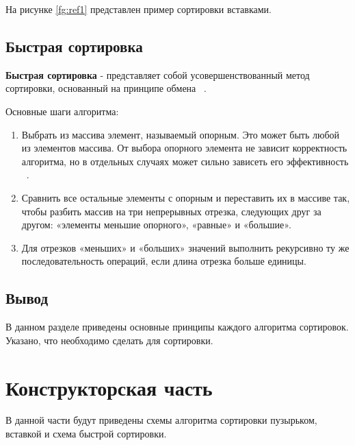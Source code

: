 \documentclass[12pt]{report}
\begin{document}
 На рисунке \ref{fg:ref1} представлен пример сортировки вставками.
\begin{figure}[ht!]
\end{figure}
\newpage
 \section{Быстрая сортировка}
 \textbf{Быстрая сортировка} - представляет собой усовершенствованный метод сортировки, основанный на принципе обмена  ~\cite{four}.

Основные шаги алгоритма:
\begin{enumerate}
\item Выбрать из массива элемент, называемый опорным. Это может быть любой из элементов массива. От выбора опорного элемента не зависит корректность алгоритма, но в отдельных случаях может сильно зависеть его эффективность ~\cite{five}.  
\item Сравнить все остальные элементы с опорным и переставить их в массиве так, чтобы разбить массив на три непрерывных отрезка, следующих друг за другом: «элементы меньшие опорного», «равные» и «большие».
\item Для отрезков «меньших» и «больших» значений выполнить рекурсивно ту же последовательность операций, если длина отрезка больше единицы.
\end{enumerate}

\section{Вывод}
В данном разделе приведены основные принципы каждого алгоритма сортировок. Указано, что необходимо сделать для сортировки.

\chapter{Конструкторская часть}
В данной части будут приведены схемы алгоритма сортировки пузырьком, вставкой и схема быстрой сортировки.
\end{document}
